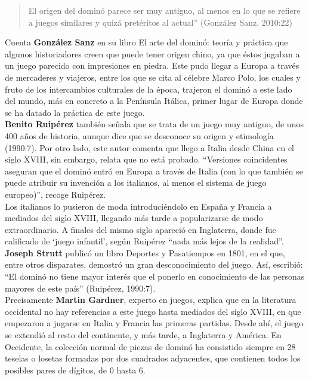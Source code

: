 \begin{quote}
El origen del dominó parece ser muy antiguo, al menos en lo que se refiere a juegos similares y quizá
pretéritos al actual” (González Sanz, 2010:22)
\end{quote}

Cuenta \textbf{González Sanz} en su libro El arte del dominó: teoría y práctica \cite{sanz00} que algunos historiadores
creen que puede tener origen chino, ya que éstos jugaban a un juego parecido con impresiones en piedra. Este pudo llegar a Europa a través de mercaderes y viajeros, entre los que se cita al célebre
Marco Polo, los cuales y fruto de los intercambios culturales de la época, trajeron el dominó a este
lado del mundo, más en concreto a la Península Itálica, primer lugar de Europa donde se ha datado la
práctica de este juego. \\

\textbf{Benito Ruipérez} \cite{mora90} también señala que se trata de un juego muy antiguo, de unos 400 años de historia,
aunque dice que se desconoce su origen y etimología (1990:7). Por otro lado, este autor comenta que
llego a Italia desde China en el siglo XVIII, sin embargo, relata que no está probado. “Versiones
coincidentes aseguran que el dominó entró en Europa a través de Italia (con lo que también se puede
atribuir su invención a los italianos, al menos el sistema de juego europeo)”, recoge Ruipérez. \\

Los italianos lo pusieron de moda introduciéndolo en España y Francia a mediados del siglo XVIII,
llegando más tarde a popularizarse de modo extraordinario. A finales del mismo siglo apareció en
Inglaterra, donde fue calificado de ‘juego infantil’, según Ruipérez “nada más lejos de la realidad”.
\textbf{Joseph Strutt} publicó un libro Deportes y Pasatiempos en 1801, en el que, entre otros disparates,
demostró un gran desconocimiento del juego. Así, escribió: “El dominó no tiene mayor interés que
el ponerlo en conocimiento de las personas mayores de este país” (Ruipérez, 1990:7). \\

Precisamente \textbf{Martin Gardner}, experto en juegos, explica que en la literatura occidental no hay
referencias a este juego hasta mediados del siglo XVIII, en que empezaron a jugarse en Italia y
Francia las primeras partidas. Desde ahí, el juego se extendió al resto del continente, y más tarde,
a Inglaterra y América. En Occidente, la colección normal de piezas de dominó ha consistido siempre
en 28 teselas o losetas formadas por dos cuadrados adyacentes, que contienen todos los posibles
pares de dígitos, de 0 hasta 6. \\

